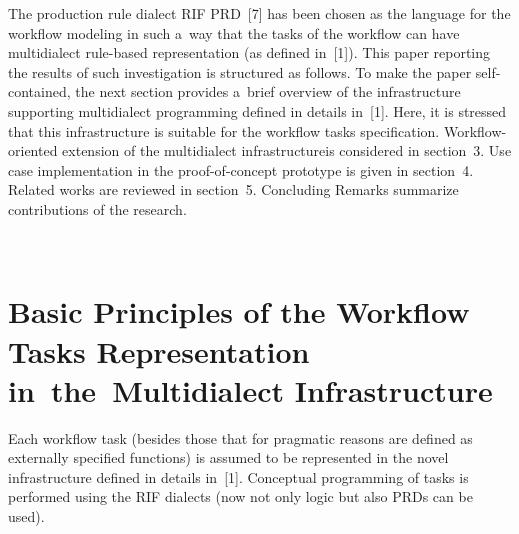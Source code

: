 \begin{multicols}{2}
  The production rule dialect RIF PRD~[7] has been chosen as the language for the
workflow modeling in such a~way that the tasks of the workflow can have
multidialect rule-based representation (as defined in~[1]). This paper reporting the results
of such investigation is structured as follows. To make the paper self-contained, the
next section provides a~brief overview of the infrastructure supporting multidialect
programming defined in details in~[1]. Here, it is stressed
 that this infrastructure is
suitable for the workflow tasks specification. Workflow-oriented extension of the
multidialect infrastructureis considered in section~3. Use case implementation in
the proof-of-concept prototype is given in section~4. Related works are reviewed
in section~5. Concluding Remarks summarize contributions of the research.


\begin{figure*} %
\vspace*{1pt}
 \begin{center}
 \mbox{%
 \epsfxsize=164.734mm
 }
 \end{center}
 \vspace*{-9pt}
\vspace*{-2pt}
  \end{figure*}

\section{Basic Principles of the Workflow Tasks Representation
in~the~Multidialect Infrastructure}

  \noindent
  Each workflow task (besides those that for pragmatic reasons are defined as
externally specified functions) is assumed to be represented in the novel infrastructure
defined in details in~[1]. Conceptual programming of tasks is performed using the
RIF dialects (now not only logic but also PRDs can be
used).


\end{multicols}
